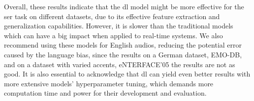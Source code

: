 Overall, these results indicate that the \ac{dl} model might be more effective for the \ac{ser} task on different datasets, due to its effective feature extraction and generalization capabilities. However, it is slower than the traditional models which can have a big impact when applied to real-time systems. We also recommend using these models for English audios, reducing the potential error caused by the language bias, since the results on a German dataset, EMO-DB, and on a dataset with varied accents, eNTERFACE'05 the results are not as good. It is also essential to acknowledge that \ac{dl} can yield even better results with more extensive models' hyperparameter tuning, which demands more computation time and power for their development and evaluation.


\begin{table}[H]
	\centering
	\caption{Final models trained on \ac{iemo} and evaluated on different datasets.}
	\label{final_models}
\end{table}


